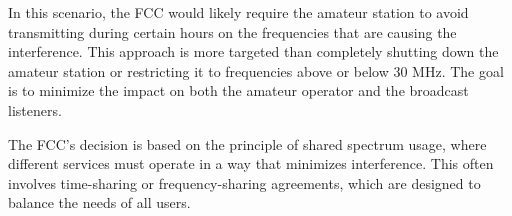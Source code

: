 In this scenario, the FCC would likely require the amateur station to avoid transmitting during certain hours on the frequencies that are causing the interference. This approach is more targeted than completely shutting down the amateur station or restricting it to frequencies above or below 30 MHz. The goal is to minimize the impact on both the amateur operator and the broadcast listeners.

The FCC's decision is based on the principle of shared spectrum usage, where different services must operate in a way that minimizes interference. This often involves time-sharing or frequency-sharing agreements, which are designed to balance the needs of all users.

